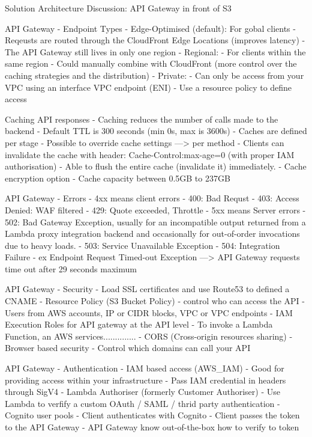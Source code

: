 \documentclass[11pt]{book}
\begin{document}
    Solution Architecture Discussion: API Gateway in front of S3

    API Gateway - Endpoint Types
    - Edge-Optimised (default): For gobal clients
        - Reqeusts are routed through the CloudFront Edge Locations (improves latency)
        - The API Gateway still lives in only one region
    - Regional:
        - For clients within the same region
        - Could manually combine with CloudFront (more control over the caching strategies and the distribution)
    - Private:
        - Can only be access from your VPC using an interface VPC endpoint (ENI)
        - Use a resource policy to define access

    Caching API responses
    - Caching reduces the number of calls made to the backend
    - Default TTL is 300 seconds (min 0s, max is 3600s)
    - Caches are defined per stage
    - Possible to override cache settings ---> per method
    - Clients can invalidate the cache with header: Cache-Control:max-age=0 (with proper IAM authorisation)
    - Able to flush the entire cache (invalidate it) immediately.
    - Cache encryption option
    - Cache capacity between 0.5GB to 237GB

    API Gateway - Errors
    - 4xx means client errors
        - 400: Bad Requst
        - 403: Access Denied: WAF filtered
        - 429: Quote exceeded, Throttle
    - 5xx means Server errors
        - 502: Bad Gateway Exception, usually for an incompatible output returned from a Lambda proxy integration backend and occasionally for out-of-order invocations due to heavy loads.
        - 503: Service Unavailable Exception
        - 504: Integration Failure - ex Endpoint Request Timed-out Exception
            ---> API Gateway requests time out after 29 seconds maximum

    API Gateway - Security
    - Load SSL certificates and use Route53 to defined a CNAME
    - Resource Policy (S3 Bucket Policy)
        - control who can access the API
        - Users from AWS accounts, IP or CIDR blocks, VPC or VPC endpoints
    - IAM Execution Roles for API gateway at the API level
        - To invoke a Lambda Function, an AWS services..............
    - CORS (Cross-origin resources sharing)
        - Browser based security
        - Control which domains can call your API

    API Gateway - Authentication
    - IAM based access (AWS_IAM)
        - Good for providing access within your infrastructure
        - Pass IAM credential in headers through SigV4
    - Lambda Authoriser (formerly Customer Authoriser)
        - Use Lambda to verfify a custom OAuth / SAML / thrid party authentication
    - Cognito user pools
        - Client authenticates with Cognito
        - Client passes the token to the API Gateway
        - API Gateway know out-of-the-box how to verify to token
\end{document}
